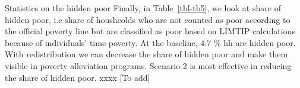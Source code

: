 \documentclass[
  11pt,
]{article}
\begin{document}
Statistics on the hidden poor Finally, in Table~\ref{tbl-tb5}, we look
at share of hidden poor, i.e share of housheolds who are not counted as
poor according to the official poverty line but are classified as poor
based on LIMTIP calculations because of individuals' time poverty. At
the baseline, 4.7 \% hh are hidden poor. With redistribution we can
decrease the share of hidden poor and make them visible in poverty
alleviation programs. Scenario 2 is most effective in reducing the share
of hidden poor. xxxx {[}To add{]}

\begin{table}

\caption{\label{tbl-tb5}Hidden Poor by Characteristics}


\end{table}%
\end{document}
